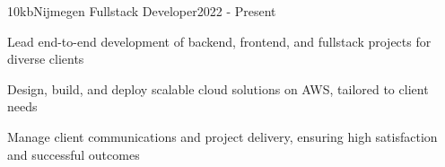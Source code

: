 \resumeSubheading
  {10kb}{Nijmegen}
  {Fullstack Developer}{2022 - Present}
  \vspace{\experienceItemSpacing}
  \resumeItemListStart
\item Lead end-to-end development of backend, frontend, and fullstack projects for diverse clients
\item Design, build, and deploy scalable cloud solutions on AWS, tailored to client needs
\item Manage client communications and project delivery, ensuring high satisfaction and successful outcomes
  \resumeItemListEnd 